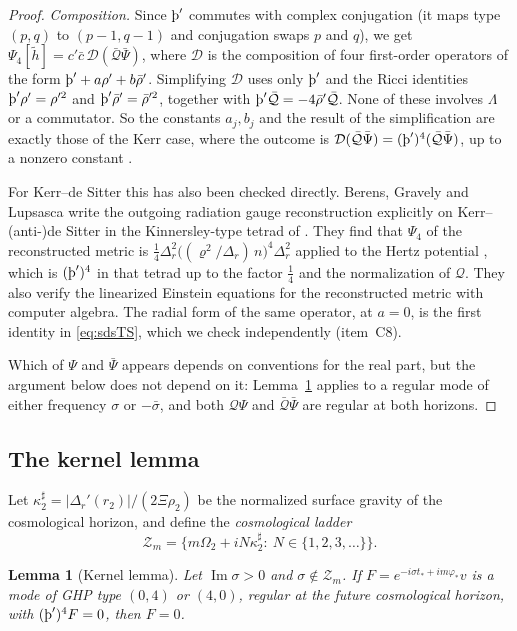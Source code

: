 \documentclass[11pt]{amsart}
\newtheorem{lemma}[theorem]{Lemma}
\theoremstyle{definition}
\theoremstyle{remark}
\numberwithin{equation}{section}
\newcommand{\Th}{\text{\th}}
\renewcommand{\Im}{\operatorname{Im}}
\begin{document}
\begin{proof}
\emph{Composition.} Since $\Th'$ commutes with complex conjugation (it maps type $(p,q)$ to $(p-1,q-1)$ and conjugation
swaps $p$ and $q$), we get $\Psi_4[\tilde h]=c'\bar c\,\mathcal D(\bar{\mathcal Q}\bar\Psi)$, where $\mathcal D$ is the composition of
four first-order operators of the form $\Th'+a\rho'+b\bar\rho'$. Simplifying $\mathcal D$ uses only $\Th'$ and the Ricci
identities $\Th'\rho'=\rho'^2$ and $\Th'\bar\rho'=\bar\rho'^2$, together with $\Th'\bar{\mathcal Q}=-4\bar\rho'\bar{\mathcal Q}$. None of
these involves $\Lambda$ or a commutator. So the constants $a_j,b_j$ and the result of the simplification are exactly
those of the Kerr case, where the outcome is $\mathcal D(\bar{\mathcal Q}\bar\Psi)=(\Th')^4(\bar{\mathcal Q}\bar\Psi)$, up to a nonzero
constant \cite{Wal78,LW02}.

For Kerr--de Sitter this has also been checked directly. Berens, Gravely and Lupsasca write the outgoing radiation
gauge reconstruction explicitly on Kerr--(anti-)de Sitter in the Kinnersley-type tetrad of \cite{STU98}. They find
that $\Psi_4$ of the reconstructed metric is $\frac14\Delta_r^2\big((\varrho^2/\Delta_r)\,n\big)^4\Delta_r^2$ applied to the
Hertz potential \cite[(1.18b) and \S3.1]{BGL25}, which is $(\Th')^4$ in that tetrad up to the factor $\frac14$ and the
normalization of $\mathcal Q$. They also verify the linearized Einstein equations for the reconstructed metric with
computer algebra. The radial form of the same operator, at $a=0$, is the first identity in \eqref{eq:sdsTS}, which we
check independently (item~C8).

Which of $\Psi$ and $\bar\Psi$ appears depends on conventions for the real part, but the argument below does not
depend on it: Lemma~\ref{lem:kernel} applies to a regular mode of either frequency $\sigma$ or $-\bar\sigma$, and both
$\mathcal Q\Psi$ and $\bar{\mathcal Q}\bar\Psi$ are regular at both horizons.
\end{proof}

\subsection{The kernel lemma}\label{subsec:kernel}
Let $\kappa_2^\sharp=|\Delta_r'(r_2)|/(2\Xi\rho_2)$ be the normalized surface gravity of the cosmological horizon,
and define the \emph{cosmological ladder}
\[
\mathcal Z_m=\big\{m\Omega_2+iN\kappa_2^\sharp:\ N\in\{1,2,3,\dots\}\big\}.
\]

\begin{lemma}[Kernel lemma]\label{lem:kernel}
Let $\Im\sigma>0$ and $\sigma\notin\mathcal Z_m$. If $F=e^{-i\sigma t_*+im\varphi_*}v$ is a mode of GHP type
$(0,4)$ or $(4,0)$, regular at the future cosmological horizon, with $(\Th')^4F=0$, then $F=0$.
\end{lemma}
\end{document}
